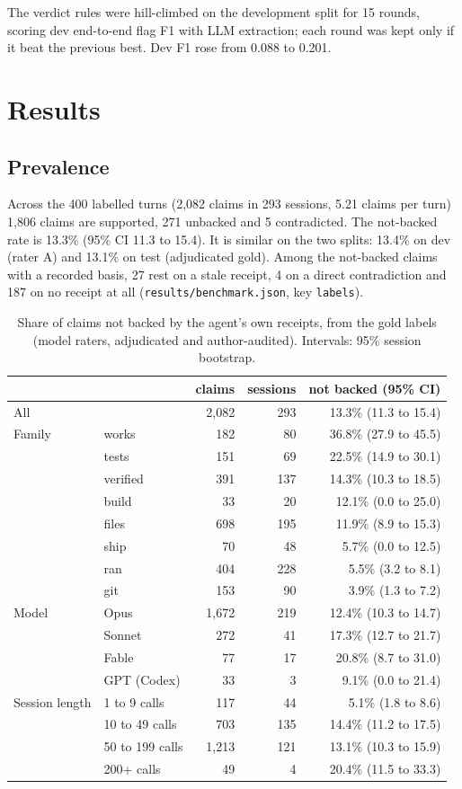 \documentclass[11pt]{article}
\begin{document}
The verdict rules were hill-climbed on the development split for 15 rounds, scoring dev end-to-end flag F1 with
LLM extraction; each round was kept only if it beat the previous best. Dev F1 rose from 0.088 to 0.201.

\section{Results}

\subsection{Prevalence}

Across the 400 labelled turns (2,082 claims in 293 sessions, 5.21 claims per turn) 1,806 claims are supported,
271 unbacked and 5 contradicted. The not-backed rate is 13.3\% (95\% CI 11.3 to 15.4). It is similar on the two
splits: 13.4\% on dev (rater A) and 13.1\% on test (adjudicated gold). Among the not-backed claims with a recorded
basis, 27 rest on a stale receipt, 4 on a direct contradiction and 187 on no receipt at all
(\texttt{results/benchmark.json}, key \texttt{labels}).

\begin{table}[h]
\centering
\caption{Share of claims not backed by the agent's own receipts, from the gold labels (model raters, adjudicated and author-audited). Intervals: 95\% session bootstrap.}
\label{tab:prev}
\begin{tabular}{llrrr}
\toprule
 & & claims & sessions & not backed (95\% CI) \\
\midrule
All & & 2,082 & 293 & 13.3\% (11.3 to 15.4) \\
\midrule
Family & works & 182 & 80 & 36.8\% (27.9 to 45.5) \\
 & tests & 151 & 69 & 22.5\% (14.9 to 30.1) \\
 & verified & 391 & 137 & 14.3\% (10.3 to 18.5) \\
 & build & 33 & 20 & 12.1\% (0.0 to 25.0) \\
 & files & 698 & 195 & 11.9\% (8.9 to 15.3) \\
 & ship & 70 & 48 & 5.7\% (0.0 to 12.5) \\
 & ran & 404 & 228 & 5.5\% (3.2 to 8.1) \\
 & git & 153 & 90 & 3.9\% (1.3 to 7.2) \\
\midrule
Model & Opus & 1,672 & 219 & 12.4\% (10.3 to 14.7) \\
 & Sonnet & 272 & 41 & 17.3\% (12.7 to 21.7) \\
 & Fable & 77 & 17 & 20.8\% (8.7 to 31.0) \\
 & GPT (Codex) & 33 & 3 & 9.1\% (0.0 to 21.4) \\
\midrule
Session length & 1 to 9 calls & 117 & 44 & 5.1\% (1.8 to 8.6) \\
 & 10 to 49 calls & 703 & 135 & 14.4\% (11.2 to 17.5) \\
 & 50 to 199 calls & 1,213 & 121 & 13.1\% (10.3 to 15.9) \\
 & 200+ calls & 49 & 4 & 20.4\% (11.5 to 33.3) \\
\bottomrule
\end{tabular}
\end{table}
\end{document}
